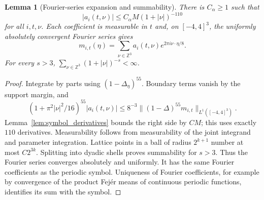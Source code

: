 \documentclass[12pt,reqno]{amsart}
\theoremstyle{plain}
\newtheorem{lemma}[theorem]{Lemma}
\theoremstyle{definition}
\theoremstyle{remark}
\numberwithin{equation}{section}
\newcommand{\Z}{\mathbb Z}
\begin{document}
\begin{lemma}[Fourier-series expansion and summability]\label{lem:fourier_series}
There is $C_\alpha\ge1$ such that
\begin{equation}\label{eq:coefficient_decay}
 |a_i(t,\nu)|\le C_\alpha M(1+|\nu|)^{-110}
\end{equation}
for all $i,t,\nu$. Each coefficient is measurable in $t$ and, on
$[-4,4]^3$, the uniformly absolutely convergent Fourier series gives
\[
 m_{i,t}(\eta)=\sum_{\nu\in\Z^3}a_i(t,\nu)e^{2\pi i\nu\cdot\eta/8}.
\]
For every $s>3$, $\sum_{\nu\in\Z^3}(1+|\nu|)^{-s}<\infty$.
\end{lemma}
\begin{proof}
Integrate by parts using $(1-\Delta_\eta)^{55}$. Boundary terms
vanish by the support margin, and
\[
 (1+\pi^2|\nu|^2/16)^{55}|a_i(t,\nu)|
 \le8^{-3}\|(1-\Delta)^{55}m_{i,t}\|_{L^1([-4,4]^3)}.
\]
Lemma~\ref{lem:symbol_derivatives} bounds the right side by $CM$;
this uses exactly $110$ derivatives. Measurability follows from
measurability of the joint integrand and parameter integration.
Lattice points in a ball of radius $2^{k+1}$ number at most
$C2^{3k}$. Splitting into dyadic shells proves summability for $s>3$.
Thus the Fourier series converges absolutely and uniformly. It has
the same Fourier coefficients as the periodic symbol. Uniqueness
of Fourier coefficients, for example by convergence of the product
Fej\'er means of continuous periodic functions, identifies its sum
with the symbol.
\end{proof}
\end{document}
